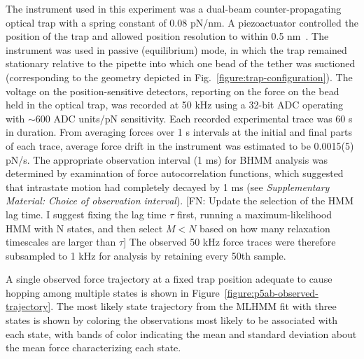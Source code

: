 \documentclass[aps,pre,twocolumn,superscriptaddress,nofootinbib,longbibliography]{revtex4-1}
\begin{document}
{The instrument used in this experiment was a dual-beam counter-propagating optical trap with a spring constant of 0.08 pN/nm.  
A piezoactuator controlled the position of the trap and allowed position resolution to within 0.5 nm~\cite{bustamante-smith:2006:minitweezers-patent}.  
The instrument was used in passive (equilibrium) mode, in which the trap remained stationary relative to the pipette into which one bead of the tether was suctioned (corresponding to the geometry depicted in Fig.~\ref{figure:trap-configuration}).
The voltage on the position-sensitive detectors, reporting on the force on the bead held in the optical trap, was recorded at 50 kHz using a 32-bit ADC operating with $\sim$600 ADC units/pN sensitivity.
Each recorded experimental trace was 60 s in duration.
From averaging forces over 1 s intervals at the initial and final parts of each trace, average force drift in the instrument was estimated to be 0.0015(5) pN/s.  
The appropriate observation interval (1 ms) for BHMM analysis was determined by examination of force autocorrelation functions, which suggested that intrastate motion had completely decayed by 1 ms (see \emph{Supplementary Material: Choice of observation interval}).
{\color{magenta}[FN: Update the selection of the HMM lag time. I suggest fixing the lag time $\tau$ first, running a maximum-likelihood HMM with N states, and then select $M<N$ based on how many relaxation timescales are larger than $\tau$]}
The observed 50 kHz force traces were therefore subsampled  to 1 kHz for analysis by retaining every 50th sample.
\color{black}

A single observed force trajectory at a fixed trap position adequate to cause hopping among multiple states is shown in Figure~\ref{figure:p5ab-observed-trajectory}.
The most likely state trajectory from the MLHMM fit with three states is shown by coloring the observations most likely to be associated with each state, with bands of color indicating the mean and standard deviation about the mean force characterizing each state.

}
\end{document}
